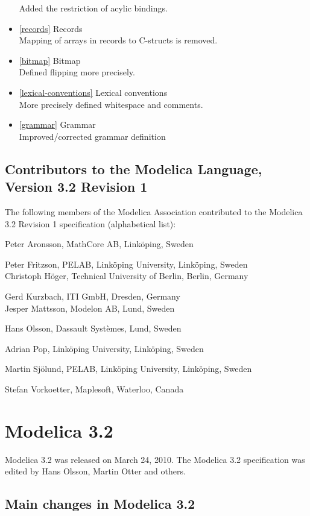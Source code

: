 \documentclass[10pt,a4paper]{report}
\def\doublelabel#1{\label{#1}\hypertarget{#1}{}}
\begin{document}
\begin{itemize}
  Added the restriction of acylic bindings.
\item
  \ref{records} Records\\
  Mapping of arrays in records to C-structs is removed.
\item
  \ref{bitmap} Bitmap\\
  Defined flipping more precisely.
\item
  \ref{lexical-conventions} Lexical conventions\\
  More precisely defined whitespace and comments.
\item
  \ref{grammar} Grammar\\
  Improved/corrected grammar definition
\end{itemize}

\subsection{Contributors to the Modelica Language, Version 3.2 Revision 1}\doublelabel{contributors-to-the-modelica-language-version-3-2-revision-1}

The following members of the Modelica Association contributed to the
Modelica 3.2 Revision 1 specification (alphabetical list):

Peter Aronsson, MathCore AB, Linköping, Sweden

Peter Fritzson, PELAB, Linköping University, Linköping, Sweden\\
Christoph Höger, Technical University of Berlin, Berlin, Germany

Gerd Kurzbach, ITI GmbH, Dresden, Germany\\
Jesper Mattsson, Modelon AB, Lund, Sweden

Hans Olsson, Dassault Systèmes, Lund, Sweden

Adrian Pop, Linköping University, Linköping, Sweden

Martin Sjölund, PELAB, Linköping University, Linköping, Sweden

Stefan Vorkoetter, Maplesoft, Waterloo, Canada

\section{Modelica 3.2}\doublelabel{modelica-3-2}

Modelica 3.2 was released on March 24, 2010. The Modelica 3.2
specification was edited by Hans Olsson, Martin Otter and others.

\subsection{Main changes in Modelica 3.2}\doublelabel{main-changes-in-modelica-3-2}
\end{document}
